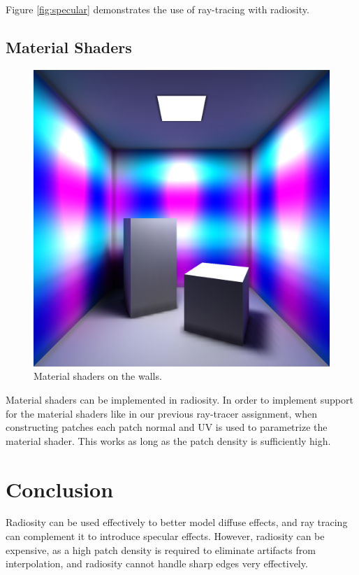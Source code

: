 \documentclass[sigconf]{acmart}
\begin{document}
Figure \ref{fig:specular} demonstrates the use of ray-tracing with radiosity.

\subsection{Material Shaders}

\begin{figure}[t]
    \includegraphics[width=\linewidth]{reportfiles/shaders}
    \caption{Material shaders on the walls.}
    \label{fig:shaders}
\end{figure}

Material shaders can be implemented in radiosity. In order to implement support for the material shaders like in our previous ray-tracer assignment, when constructing patches each patch normal and UV is used to parametrize the material shader. This works as long as the patch density is sufficiently high.

\section{Conclusion}

Radiosity can be used effectively to better model diffuse effects, and ray tracing can complement it to introduce specular effects. However, radiosity can be expensive, as a high patch density is required to eliminate artifacts from interpolation, and radiosity cannot handle sharp edges very effectively.



\end{document}
